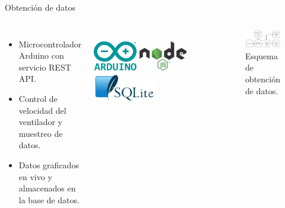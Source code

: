 \begin{frame}{Obtención de datos}
\begin{columns}
    \begin{itemize}
        \item Microcontrolador Arduino con servicio REST API.
        \item Control de velocidad del ventilador y muestreo de datos.
        \item Datos graficados en vivo y almacenados en la base de datos.
    \end{itemize}
    \centering
    \\[1cm]
    \includegraphics[height=0.13\textwidth]{dump/arduino.png}
    \hspace{0.1cm}
    \includegraphics[height=0.13\textwidth]{dump/node.png}
    \hspace{0.1cm}
    \includegraphics[height=0.13\textwidth]{dump/sql.png}
    \begin{block}{}
            \begin{figure}[ht!]
                \centering
                \includegraphics[width=\textwidth]{dump/diaaaa.png}
                \caption{Esquema de obtención de datos.}
            \end{figure}
            \end{block}
\end{columns}
\end{frame}

